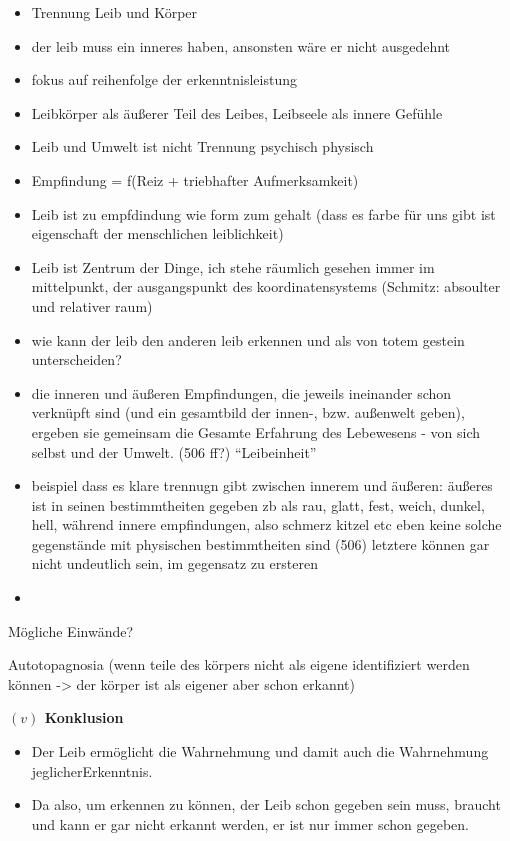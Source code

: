 \documentclass[a4paper, 12pt]{article}
\begin{document}
\begin{onehalfspace}
\begin{itemize}
  \item Trennung Leib und Körper
  \item der leib muss ein inneres haben, ansonsten wäre er nicht ausgedehnt
  \item fokus auf reihenfolge der erkenntnisleistung
  \item Leibkörper als äußerer Teil des Leibes, Leibseele als innere Gefühle
  \item Leib und Umwelt ist nicht Trennung psychisch physisch
  \item Empfindung = f(Reiz + triebhafter Aufmerksamkeit)
  \item Leib ist zu empfdindung wie form zum gehalt (dass es farbe für uns gibt ist eigenschaft der menschlichen leiblichkeit)
  \item Leib ist Zentrum der Dinge, ich stehe räumlich gesehen immer im mittelpunkt, der ausgangspunkt des koordinatensystems (Schmitz: absoulter und relativer raum)
  \item wie kann der leib den anderen leib erkennen und als von totem gestein unterscheiden?
  \item die inneren und äußeren Empfindungen, die jeweils ineinander schon verknüpft sind (und ein gesamtbild der innen-, bzw. außenwelt geben), ergeben sie gemeinsam die Gesamte Erfahrung des Lebewesens - von sich selbst und der Umwelt. (506 ff?) "`Leibeinheit"'
  \item beispiel dass es klare trennugn gibt zwischen innerem und äußeren: äußeres ist in seinen bestimmtheiten gegeben zb als rau, glatt, fest, weich, dunkel, hell, während innere empfindungen, also schmerz kitzel etc eben keine solche gegenstände mit physischen bestimmtheiten sind (506) letztere können gar nicht undeutlich sein, im gegensatz zu ersteren
  \item 
\end{itemize}

Mögliche Einwände?

Autotopagnosia (wenn teile des körpers nicht als eigene identifiziert werden können -> der körper ist als eigener aber schon erkannt)

\vspace{5mm}
\noindent\textbf{$(v)$ Konklusion}

\begin{itemize}
  \item Der Leib ermöglicht die Wahrnehmung und damit auch die Wahrnehmung jeglicherErkenntnis.
  \item Da also, um erkennen zu können, der Leib schon gegeben sein muss, braucht und kann er gar nicht erkannt werden, er ist nur immer schon gegeben.
\end{itemize}



\end{onehalfspace}
\end{document}
